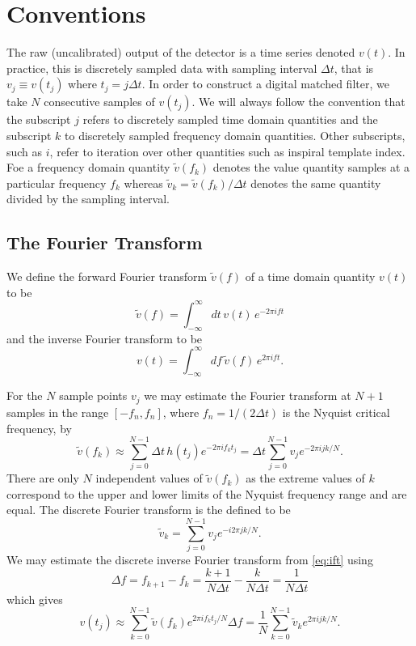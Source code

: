 
\section{Conventions}
\label{s:conventions}

The raw (uncalibrated) output of the detector is a time series denoted $v(t)$.
In practice, this is discretely sampled data with sampling interval $\Delta
t$, that is $v_j \equiv v(t_j)$ where $t_j = j\Delta t$.  In order to
construct a digital matched filter, we take $N$ consecutive samples of
$v(t_j)$. We will always follow the convention that the subscript $j$ refers to
discretely sampled time domain quantities and the subscript $k$ to discretely
sampled frequency domain quantities. Other subscripts, such as $i$, refer to
iteration over other quantities such as inspiral template index. Foe a
frequency domain quantity $\tilde{v}(f_k)$ denotes the value quantity samples
at a particular frequency $f_k$ whereas $\tilde{v}_k = \tilde{v}(f_k) / \Delta
t$ denotes the same quantity divided by the sampling interval.

\subsection{The Fourier Transform}
\label{ss:ftconv}

We define the forward Fourier transform $\tilde{v}(f)$ of a time domain
quantity $v(t)$ to be
\begin{equation}
\label{eq:ft}
\tilde{v}(f)=\int_{-\infty}^\infty dt\,v(t)\, e^{- 2 \pi i f t}
\end{equation}
and the inverse Fourier transform to be 
\begin{equation}
\label{eq:ift}
v(t)=\int_{-\infty}^\infty df\,\tilde{v}(f)\, e^{2 \pi i f t}.
\end{equation}

For the $N$ sample points $v_j$ we may estimate the Fourier transform at 
$N + 1$ samples in the range $[-f_n,f_n]$, where $f_n = 1/(2\Delta t)$ is the
Nyquist critical frequency, by
\begin{equation}
\tilde{v}(f_k) \approx \sum_{j=0}^{N-1} \Delta t\, h(t_j) e^{-2 \pi i f_k t_j}
= \Delta t \sum_{j=0}^{N-1} v_j e^{-2 \pi i j k / N}.
\end{equation}
There are only $N$ independent values of $\tilde{v}(f_k)$ as the extreme
values of $k$ correspond to the upper and lower limits of the Nyquist
frequency range and are equal. The discrete Fourier transform is the defined
to be\cite{T010095}
\begin{equation}
\tilde{v}_k = \sum_{j=0}^{N-1} v_j e^{-i 2 \pi j k / N}.
\end{equation}
We may estimate the discrete inverse Fourier transform from \ref{eq:ift} using
\begin{equation}
\Delta f = f_{k+1} - f_k = \frac{k+1}{N\Delta t} - \frac{k}{N\Delta t} =
\frac{1}{N\Delta t}
\end{equation}
which gives
\begin{equation}
v(t_j) \approx \sum_{k=0}^{N-1} \tilde{v}(f_k) e^{2 \pi i f_k t_j / N} \Delta f
= \frac{1}{N} \sum_{k=0}^{N-1} \tilde{v}_k e^{2 \pi i j k / N}.
\end{equation}

